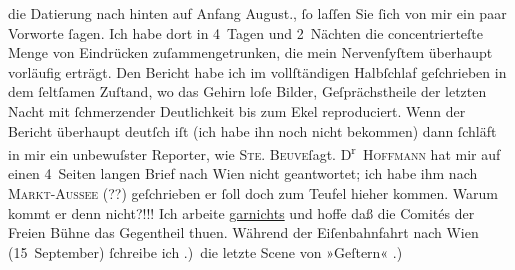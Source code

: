 \begin{ledgroupsized}[t]{13cm}
{{{                  die Datierung nach hinten auf Anfang August.}}}\label{K_L00026_3h}, ſo laſſen Sie ſich von mir {\pb}ein paar Vorworte ſagen. Ich habe
               dort in 4 Tagen und 2 Nächten die concentrierteſte Menge von Eindrücken
               zuſammengetrunken, die mein Nervenſyſtem überhaupt vorläufig erträgt. Den Bericht
               habe ich im vollſtändigen Halbſchlaf geſchrieben in dem ſeltſamen Zuſtand, wo das
               Gehirn loſe Bilder, Geſprächstheile der letzten Nacht mit ſchmerzender Deutlichkeit
               bis zum Ekel reproduciert. Wenn der Bericht überhaupt deutſch iſt (ich habe ihn noch
               nicht bekommen) dann ſchläft in mir ein unbewuſster Reporter, \label{K_L00026_4v}\label{K_L00026_4h} wie \textsc{Ste. Beuve}ſagt. D\textsuperscript{r} \textsc{Hoffmann} hat mir auf einen 4 Seiten langen Brief nach Wien nicht geantwortet; ich habe ihm nach {\pb}\textsc{Markt-Aussee} (??) geſchrieben er ſoll doch zum Teufel hieher kommen. Warum kommt er denn
               nicht?!!! Ich arbeite \uline{garnichts} und hoffe daß die
               Comités der Freien Bühne das Gegentheil thuen.\pend
           \pstart
           Während der Eiſenbahnfahrt nach Wien
                  (15 September) ſchreibe ich\pend
           .) die letzte Scene von »Geſtern«\pend
           .) \label{K_L00026_5v}
\end{ledgroupsized}

